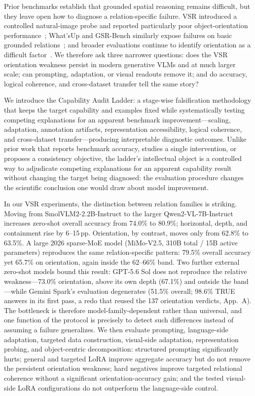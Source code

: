\documentclass[10pt,twocolumn,letterpaper]{article}
\newcommand{\modelsmall}{SmolVLM2-2.2B-Instruct}
\newcommand{\modellarge}{Qwen2-VL-7B-Instruct}
\newcommand{\modelfrontier}{MiMo-V2.5}
\begin{document}
Prior benchmarks establish that grounded spatial reasoning remains difficult, but they leave open how to diagnose a relation-specific failure. VSR introduced a controlled natural-image probe and reported particularly poor object-orientation performance~\cite{liu2023vsr}; What'sUp and GSR-Bench similarly expose failures on basic grounded relations~\cite{kamath2023whatsup,rajabi2024gsrbench}; and broader evaluations continue to identify orientation as a difficult factor~\cite{wang2025site}. We therefore ask three narrower questions: does the VSR orientation weakness persist in modern generative VLMs and at much larger scale; can prompting, adaptation, or visual readouts remove it; and do accuracy, logical coherence, and cross-dataset transfer tell the same story?

We introduce the Capability Audit Ladder: a stage-wise falsification methodology that keeps the target capability and examples fixed while systematically testing competing explanations for an apparent benchmark improvement---scaling, adaptation, annotation artifacts, representation accessibility, logical coherence, and cross-dataset transfer---producing interpretable diagnostic outcomes. Unlike prior work that reports benchmark accuracy, studies a single intervention, or proposes a consistency objective, the ladder's intellectual object is a controlled way to adjudicate competing explanations for an apparent capability result without changing the target being diagnosed: the evaluation procedure changes the scientific conclusion one would draw about model improvement.

In our VSR experiments, the distinction between relation families is striking. Moving from \modelsmall{} to the larger \modellarge{} increases zero-shot overall accuracy from 74.0\% to 80.9\%; horizontal, depth, and containment rise by 6--15\,pp. Orientation, by contrast, moves only from 62.8\% to 63.5\%. A large 2026 sparse-MoE model (\modelfrontier{}, 310B total / 15B active parameters) reproduces the same relation-specific pattern: 79.5\% overall accuracy yet 65.7\% on orientation, again inside the 62--66\% band. Two further external zero-shot models bound this result: GPT-5.6 Sol does not reproduce the relative weakness---73.0\% orientation, above its own depth (67.1\%) and outside the band---while Gemini Spark's evaluation degenerates (51.5\% overall; 98.6\% TRUE answers in its first pass, a redo that reused the 137 orientation verdicts, App.~A). The bottleneck is therefore model-family-dependent rather than universal, and one function of the protocol is precisely to detect such differences instead of assuming a failure generalizes. We then evaluate prompting, language-side adaptation, targeted data construction, visual-side adaptation, representation probing, and object-centric decomposition: structured prompting significantly hurts; general and targeted LoRA improve aggregate accuracy but do not remove the persistent orientation weakness; hard negatives improve targeted relational coherence without a significant orientation-accuracy gain; and the tested visual-side LoRA configurations do not outperform the language-side control.
\end{document}
